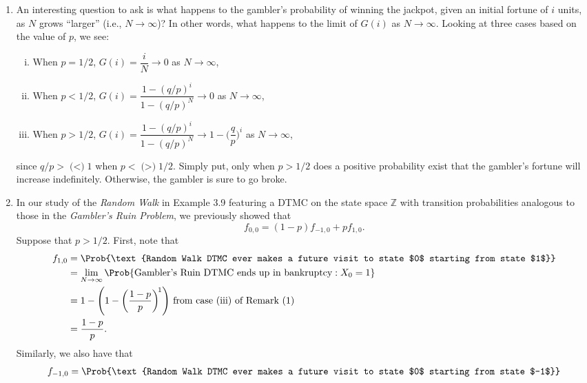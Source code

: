 \begin{enumerate}[(1)]
      \item An interesting question to ask is what happens to the gambler's probability of winning the
            jackpot, given an initial fortune of $i$ units, as $N$ grows ``larger'' (i.e., $ N\to\infty $)? In other
            words, what happens to the limit of $G(i)$ as $ N\to\infty $. Looking at three cases based on
            the value of $p$, we see:
            \begin{enumerate}[(i)]
                  \item When $ p=1/2 $, $ G(i)=\dfrac{i}{N} \to 0 $ as $ N\to\infty $,
                  \item When $ p<1/2 $, $ G(i)=\dfrac{1-(q/p)^i}{1-(q/p)^N}\to 0 $ as $ N\to\infty $,
                  \item When $ p>1/2 $, $ G(i)=\dfrac{1-(q/p)^i}{1-(q/p)^N}\to 1-\biggl(\dfrac{q}{p}\biggr)^{\! i} $ as $ N\to\infty $,
            \end{enumerate}
            since $ q/p>\text{($<$)}1 $ when $ p<\text{($>$)}1/2 $. Simply put, only when $ p>1/2 $ does a positive
            probability exist that the gambler's fortune will increase indefinitely. Otherwise, the
            gambler is sure to go broke.
      \item In our study of the \emph{Random Walk} in Example 3.9 featuring a DTMC on the state space $ \mathbb{Z} $
            with transition probabilities analogous to those in the \emph{Gambler's Ruin Problem}, we
            previously showed that
            \[ f_{0,0}=(1-p)f_{-1,0}+pf_{1,0}. \]
            Suppose that $ p>1/2 $. First, note that
            \begin{align*}
                  f_{1,0}
                   & =\Prob{\text{Random Walk DTMC ever makes a future visit to state $0$ starting from state $1$}}     \\
                   & =\lim\limits_{{N} \to {\infty}}\Prob{\text{Gambler's Ruin DTMC ends up in bankruptcy}\given X_0=1} \\
                   & =1-\Biggl(1-\biggl(\frac{1-p}{p} \biggr)^{\!1}\Biggr)\text{ from case (iii) of Remark (1)}         \\
                   & =\frac{1-p}{p}.
            \end{align*}
            Similarly, we also have that
            \begin{align*}
                  f_{-1,0}
                   & =\Prob{\text{Random Walk DTMC ever makes a future visit to state $0$ starting from state $-1$}}                                  \\

\end{align*}
\end{enumerate}
